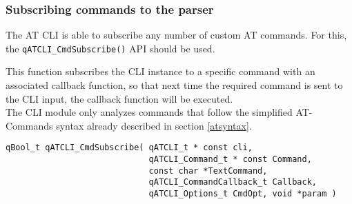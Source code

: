 \subsubsection{Subscribing commands to the parser}
The AT CLI is able to subscribe any number of custom AT commands. For this, the 
\lstinline{qATCLI_CmdSubscribe()}  API should be used.

This function subscribes the CLI instance to a specific command with an associated callback function, so that next time the required command is sent to the CLI input, the callback function will be executed. \\
The CLI module only analyzes commands that follow the simplified AT-Commands syntax already described in section \ref{atsyntax}. \\

\begin{lstlisting}[style=CStyle]
qBool_t qATCLI_CmdSubscribe( qATCLI_t * const cli, 
                             qATCLI_Command_t * const Command, 
                             const char *TextCommand, 
                             qATCLI_CommandCallback_t Callback, 
                             qATCLI_Options_t CmdOpt, void *param )
\end{lstlisting}

